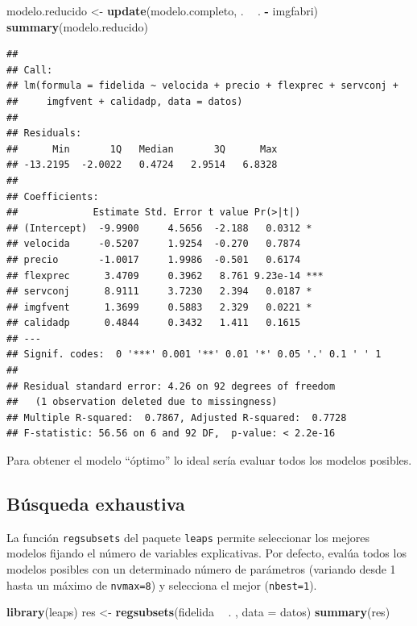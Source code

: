\documentclass[]{book}
\newenvironment{Shaded}{\begin{snugshade}}{\end{snugshade}}
\newcommand{\KeywordTok}[1]{\textcolor[rgb]{0.13,0.29,0.53}{\textbf{#1}}}
\newcommand{\DataTypeTok}[1]{\textcolor[rgb]{0.13,0.29,0.53}{#1}}
\newcommand{\StringTok}[1]{\textcolor[rgb]{0.31,0.60,0.02}{#1}}
\newcommand{\OperatorTok}[1]{\textcolor[rgb]{0.81,0.36,0.00}{\textbf{#1}}}
\newcommand{\NormalTok}[1]{#1}
\begin{document}
\begin{Shaded}
\begin{Highlighting}[]
\NormalTok{modelo.reducido <-}\StringTok{ }\KeywordTok{update}\NormalTok{(modelo.completo, . }\OperatorTok{~}\StringTok{ }\NormalTok{. }\OperatorTok{-}\StringTok{ }\NormalTok{imgfabri)}
\KeywordTok{summary}\NormalTok{(modelo.reducido)}
\end{Highlighting}
\end{Shaded}

\begin{verbatim}
## 
## Call:
## lm(formula = fidelida ~ velocida + precio + flexprec + servconj + 
##     imgfvent + calidadp, data = datos)
## 
## Residuals:
##      Min       1Q   Median       3Q      Max 
## -13.2195  -2.0022   0.4724   2.9514   6.8328 
## 
## Coefficients:
##             Estimate Std. Error t value Pr(>|t|)    
## (Intercept)  -9.9900     4.5656  -2.188   0.0312 *  
## velocida     -0.5207     1.9254  -0.270   0.7874    
## precio       -1.0017     1.9986  -0.501   0.6174    
## flexprec      3.4709     0.3962   8.761 9.23e-14 ***
## servconj      8.9111     3.7230   2.394   0.0187 *  
## imgfvent      1.3699     0.5883   2.329   0.0221 *  
## calidadp      0.4844     0.3432   1.411   0.1615    
## ---
## Signif. codes:  0 '***' 0.001 '**' 0.01 '*' 0.05 '.' 0.1 ' ' 1
## 
## Residual standard error: 4.26 on 92 degrees of freedom
##   (1 observation deleted due to missingness)
## Multiple R-squared:  0.7867, Adjusted R-squared:  0.7728 
## F-statistic: 56.56 on 6 and 92 DF,  p-value: < 2.2e-16
\end{verbatim}

Para obtener el modelo ``óptimo'' lo ideal sería evaluar todos los
modelos posibles.

\subsection{Búsqueda exhaustiva}\label{busqueda-exhaustiva}

La función \texttt{regsubsets} del paquete \texttt{leaps} permite
seleccionar los mejores modelos fijando el número de variables
explicativas. Por defecto, evalúa todos los modelos posibles con un
determinado número de parámetros (variando desde 1 hasta un máximo de
\texttt{nvmax=8}) y selecciona el mejor (\texttt{nbest=1}).

\begin{Shaded}
\begin{Highlighting}[]
\KeywordTok{library}\NormalTok{(leaps)}
\NormalTok{res <-}\StringTok{ }\KeywordTok{regsubsets}\NormalTok{(fidelida }\OperatorTok{~}\StringTok{ }\NormalTok{. , }\DataTypeTok{data =}\NormalTok{ datos)}
\KeywordTok{summary}\NormalTok{(res)}
\end{Highlighting}
\end{Shaded}
\end{document}
